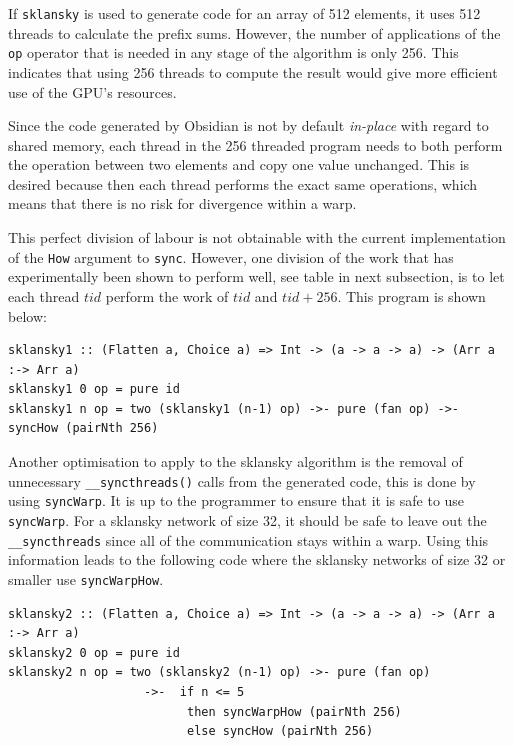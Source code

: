 If {\tt sklansky} is used to generate code for an array of 512 elements,
it uses 512 threads to calculate the prefix sums. However, the number of 
applications of the {\tt op} operator that is needed in any stage of the 
algorithm is only 256. This indicates that 
using 256 threads to compute the result would give more efficient
use of the GPU's resources.

Since the code generated by Obsidian is not by default {\em in-place} with regard 
to shared memory, each thread in the 256 threaded program needs to both perform 
the operation between two elements and copy one value unchanged. This is desired
because then each thread performs the exact same operations,
which means that there is no risk for divergence within a warp. 

This perfect division of labour is not obtainable with the current 
implementation of the {\tt How} argument to {\tt sync}. However, one 
division of the work that has experimentally been shown to perform well, see 
table in next subsection,  
is to let each thread $tid$ perform the work of $tid$ and $tid + 256$. This 
program is shown below: 

\begin{small}
\begin{verbatim}
sklansky1 :: (Flatten a, Choice a) => Int -> (a -> a -> a) -> (Arr a :-> Arr a) 
sklansky1 0 op = pure id
sklansky1 n op = two (sklansky1 (n-1) op) ->- pure (fan op) ->- syncHow (pairNth 256) 
\end{verbatim}
\end{small}


Another optimisation to apply to the sklansky algorithm is the removal of 
unnecessary {\tt \_\_syncthreads()} calls from the generated code, this is 
done by using {\tt syncWarp}. It is up to the programmer to ensure that it 
is safe to use {\tt syncWarp}. For a sklansky network of size 32, it should 
be safe to leave out the {\tt \_\_syncthreads} since all of the communication 
stays within a warp. Using this information leads to the following code where 
the sklansky networks of size 32 or smaller use {\tt syncWarpHow}.


\begin{small}
\begin{verbatim} 
sklansky2 :: (Flatten a, Choice a) => Int -> (a -> a -> a) -> (Arr a :-> Arr a) 
sklansky2 0 op = pure id
sklansky2 n op = two (sklansky2 (n-1) op) ->- pure (fan op) 
                   ->-  if n <= 5 
                         then syncWarpHow (pairNth 256)
                         else syncHow (pairNth 256)
\end{verbatim}
\end{small}


